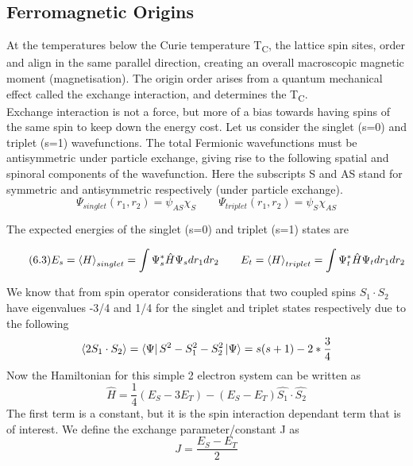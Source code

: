 \documentclass[12pt]{article}
\begin{document}
\subsection{Ferromagnetic Origins}

At the temperatures below the Curie temperature T\textsubscript{C}, the lattice spin sites, order and align in the same parallel direction, creating an overall macroscopic magnetic moment (magnetisation). The origin order arises from a quantum mechanical effect called the exchange interaction, and determines the T\textsubscript{C}. 
\\
Exchange interaction is not a force, but more of a bias towards having spins of the same spin to keep down the energy cost. Let us consider the singlet (s=0) and triplet (s=1) wavefunctions. The total Fermionic wavefunctions must be antisymmetric under particle exchange, giving rise to the following spatial and spinoral components of the wavefunction. Here the subscripts S and AS stand for symmetric and antisymmetric respectively (under particle exchange).
\begin{equation} \label{4.1} \tag{6.2}
\Psi_{singlet}(r_1,r_2)=\psi_{AS}\chi_S \qquad \Psi_{triplet}(r_1,r_2)=\psi_{S}\chi_{AS}
\end{equation}

The expected energies of the singlet (s=0) and triplet (s=1) states are

\begin{equation} \label{4.1} \tag{6.3}
E_s=\expval{H}_{singlet}=\int \Psi_s^*\hat{H}\Psi_sdr_1dr_2 \qquad E_t=\expval{H}_{triplet}=\int \Psi_t^*\hat{H}\Psi_tdr_1dr_2
\end{equation}



We know that from spin operator considerations that two coupled spins $S_1\cdot S_2$ have eigenvalues -3/4 and 1/4 for the singlet and triplet states respectively\cite{blundell} due to the following
$$\expval{2S_1\cdot S_2}=\bra{\Psi}S^2-S_1^2-S_2^2\ket{\Psi}=s(s+1)-2*\frac{3}{4}$$
Now the Hamiltonian for this simple 2 electron system can be written as
\begin{equation} \label{4.1} \tag{6.4}
\hat{H}=\frac{1}{4}(E_S-3E_T)-(E_S-E_T)\hat{S_1} \cdot \hat{S_2}
\end{equation}
The first term is a constant, but it is the spin interaction dependant term that is of interest.
We define the exchange parameter/constant J \cite{blundell}as
\begin{equation} \label{4.1} \tag{6.5}
J=\frac{E_S-E_T}{2}
\end{equation}
\end{document}
